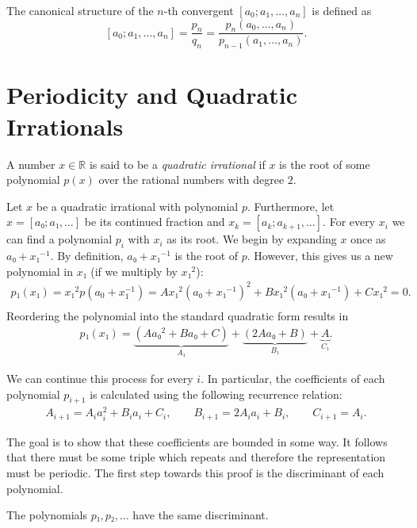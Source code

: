 \begin{definition}
  The canonical structure of the $n$-th convergent $[a_0; a_1, \dots, a_n]$ is defined as
  \[
    [a_0; a_1, \dots, a_n] = \frac{p_n}{q_n} = \frac{p_n(a_0, \dots, a_n)}{p_{n-1}(a_1, \dots, a_n)}.
  \]
\end{definition}

\section{Periodicity and Quadratic Irrationals}

\begin{definition}
  A number $x ∈ ℝ$ is said to be a \emph{quadratic irrational} if $x$ is the root of some
  polynomial $p(x)$ over the rational numbers with degree $2$.
\end{definition}

Let $x$ be a quadratic irrational with polynomial $p$.
Furthermore, let $x = [a₀; a₁, \dots]$ be its continued fraction and $x_k = [a_k; a_{k+1}, \dots]$.
For every $x_i$ we can find a polynomial $p_i$ with $x_i$ as its root.
We begin by expanding $x$ once as $a₀ + x₁^{-1}$.
By definition, $a₀ + x₁^{-1}$ is the root of $p$.
However, this gives us a new polynomial in $x₁$ (if we multiply by $x₁^2$):
\begin{align*}
  p₁(x₁) = x₁^2 p(a_0 + x_1^{-1}) = A x₁^2 (a₀ + x₁^{-1})^2 + B x₁^2 (a₀ + x₁^{-1}) + C x₁^2 = 0. \\
\end{align*}
Reordering the polynomial into the standard quadratic form results in
\begin{align*}
  p₁(x₁) = \underbrace{(A a₀^2 + B a₀ + C)}_{A₁} + \underbrace{(2A a₀ + B)}_{B₁} + \underbrace{A}_{C₁}.
\end{align*}

We can continue this process for every $i$.
In particular, the coefficients of each polynomial $p_{i+1}$ is calculated
using the following recurrence relation:
\begin{align*}
  A_{i+1} = A_i a_i^2 + B_i a_i + C_i, \qquad
  B_{i+1} = 2 A_i a_i + B_i, \qquad
  C_{i+1} = A_i.
\end{align*}

The goal is to show that these coefficients are bounded in some way.
It follows that there must be some triple which repeats and therefore the
representation must be periodic.
The first step towards this proof is the discriminant of each polynomial.

\begin{lemma}
  \label{lem:same-disc}
  The polynomials $p₁, p₂, …$ have the same discriminant.
\end{lemma}

